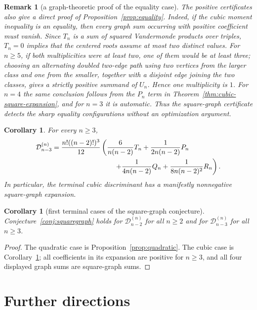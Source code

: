 \documentclass[11pt]{amsart}
\numberwithin{equation}{section}
\newtheorem{corollary}[theorem]{Corollary}
\newtheorem{remark}[theorem]{Remark}
\newcommand{\D}{\mathcal D}
\begin{document}
\begin{remark}[a graph-theoretic proof of the equality case]
The positive certificates also give a direct proof of
Proposition~\ref{prop:equality}.  Indeed, if the cubic moment inequality is an
equality, then every graph sum occurring with positive coefficient must
vanish.  Since $T_n$ is a sum of squared Vandermonde products over triples,
$T_n=0$ implies that the centered roots assume at most two distinct values.
For $n\ge5$, if both multiplicities were at least two, one of them would be at
least three; choosing an alternating doubled two-edge path using two vertices
from the larger class and one from the smaller, together with a disjoint edge
joining the two classes, gives a strictly positive summand of $U_n$.  Hence one
multiplicity is $1$.  For $n=4$ the same conclusion follows from the $P_n$ term
in Theorem~\ref{thm:cubic-square-expansion}, and for $n=3$ it is automatic.
Thus the square-graph certificate detects the sharp equality configurations
without an optimization argument.
\end{remark}

\begin{corollary}\label{cor:cubic-discriminant-squaregraph}
For every $n\ge3$,
\[
\begin{aligned}
\D_{n-3}^{(n)}
={}&\frac{n!((n-2)!)^3}{12}
\left(
\frac{6}{n(n-2)}T_n
+\frac{1}{2n(n-2)}P_n
\right.\\
&\left.\hspace{2.7cm}
+\frac{1}{4n(n-2)}Q_n
+\frac{1}{8n(n-2)^2}R_n
\right).
\end{aligned}
\]
In particular, the terminal cubic discriminant has a manifestly nonnegative
square-graph expansion.
\end{corollary}

\begin{corollary}[first terminal cases of the square-graph conjecture]
\label{cor:first-terminal-cases}
Conjecture~\ref{conj:squaregraph} holds for $\D_{n-2}^{(n)}$ for all
$n\ge2$ and for $\D_{n-3}^{(n)}$ for all $n\ge3$.
\end{corollary}

\begin{proof}
The quadratic case is Proposition~\ref{prop:quadratic}.  The cubic case is
Corollary~\ref{cor:cubic-discriminant-squaregraph}; all coefficients in its
expansion are positive for $n\ge3$, and all four displayed graph sums are
square-graph sums.
\end{proof}

\section{Further directions}
\end{document}
